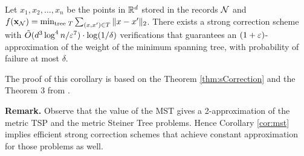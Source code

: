 \begin{corollary} \label{cor:mst}
    Let $x_1, x_2, \dots, x_n$ be the points in $\mathbb{R}^d$ stored in the records $\mathcal{N}$ and 
  $f(\mathbf{x}_{\mathcal{N}}) = \min_{\text{tree } T} \sum_{(x,x') \in T} \|x - x'\|_2$. There exists a strong correction scheme with 
  $\tilde O(d^3 \log^4 n / \varepsilon^7 )\cdot \log(1/\delta)$ verifications that guarantees an $(1 + \varepsilon)$-approximation of
  the weight of the minimum spanning tree, with probability of failure at most $\delta$.
\end{corollary}

  The proof of this corollary is based on the Theorem \ref{thm:sCorrection} and the Theorem 3 from \cite{GouleakisTZ2017}.

\textbf{Remark.} Observe that the value of the MST gives a 2-approximation of the metric TSP and the metric Steiner Tree 
problems. Hence Corollary \ref{cor:mst} implies efficient strong correction schemes that achieve constant approximation for 
those problems as well.
